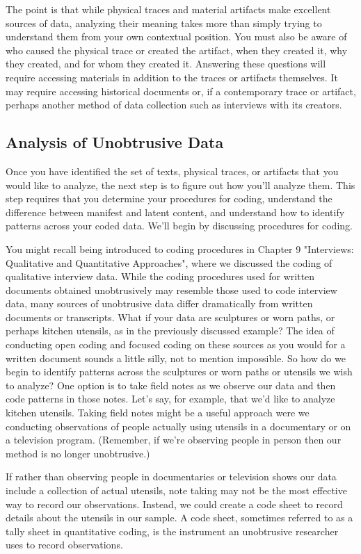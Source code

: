The point is that while physical traces and material artifacts make excellent sources of data, analyzing their meaning takes more than simply trying to understand them from your own contextual position. You must also be aware of who caused the physical trace or created the artifact, when they created it, why they created, and for whom they created it. Answering these questions will require accessing materials in addition to the traces or artifacts themselves. It may require accessing historical documents or, if a contemporary trace or artifact, perhaps another method of data collection such as interviews with its creators.

\subsection{Analysis of Unobtrusive Data}

Once you have identified the set of texts, physical traces, or artifacts that you would like to analyze, the next step is to figure out how you’ll analyze them. This step requires that you determine your procedures for coding, understand the difference between manifest and latent content, and understand how to identify patterns across your coded data. We’ll begin by discussing procedures for coding.

You might recall being introduced to coding procedures in Chapter 9 "Interviews: Qualitative and Quantitative Approaches", where we discussed the coding of qualitative interview data. While the coding procedures used for written documents obtained unobtrusively may resemble those used to code interview data, many sources of unobtrusive data differ dramatically from written documents or transcripts. What if your data are sculptures or worn paths, or perhaps kitchen utensils, as in the previously discussed example? The idea of conducting open coding and focused coding on these sources as you would for a written document sounds a little silly, not to mention impossible. So how do we begin to identify patterns across the sculptures or worn paths or utensils we wish to analyze? One option is to take field notes as we observe our data and then code patterns in those notes. Let’s say, for example, that we’d like to analyze kitchen utensils. Taking field notes might be a useful approach were we conducting observations of people actually using utensils in a documentary or on a television program. (Remember, if we’re observing people in person then our method is no longer unobtrusive.)

If rather than observing people in documentaries or television shows our data include a collection of actual utensils, note taking may not be the most effective way to record our observations. Instead, we could create a code sheet to record details about the utensils in our sample. A code sheet, sometimes referred to as a tally sheet in quantitative coding, is the instrument an unobtrusive researcher uses to record observations.

